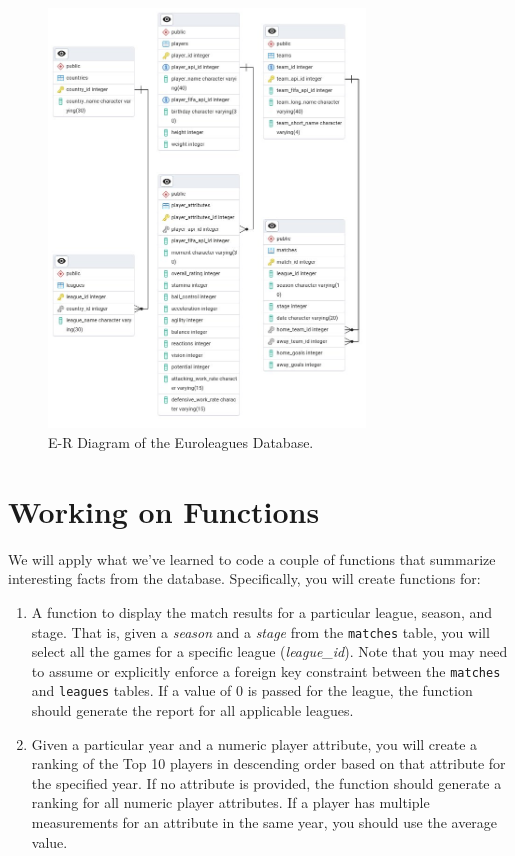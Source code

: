 \documentclass{article}
\begin{document}
\begin{figure}
 \centering
 \includegraphics[width=0.75\textwidth]{figures/Euroleagues_erd.jpg}
 \caption{E-R Diagram of the Euroleagues Database.}
 \label{fig:erd}
\end{figure}

\section{Working on Functions}
We will apply what we’ve learned to code a couple of functions that summarize interesting facts from the database. Specifically, you will create functions for:

\begin{enumerate}
    \item A function to display the match results for a particular league, season, and stage. That is, given a \textit{season} and a \textit{stage} from the \texttt{matches} table, you will select all the games for a specific league (\textit{league\_id}). Note that you may need to assume or explicitly enforce a foreign key constraint between the \texttt{matches} and \texttt{leagues} tables. If a value of 0 is passed for the league, the function should generate the report for all applicable leagues.

    \item Given a particular year and a numeric player attribute, you will create a ranking of the Top 10 players in descending order based on that attribute for the specified year. If no attribute is provided, the function should generate a ranking for all numeric player attributes.  If a player has multiple measurements for an attribute in the same year, you should use the average value.
\end{enumerate}
\end{document}
